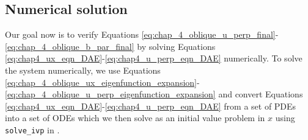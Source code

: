 \subsection{Numerical solution}
\label{sec:oblique_field_resonant_absorption_numerical_soln}

Our goal now is to verify Equations \eqref{eq:chap_4_oblique_u_perp_final}-\eqref{eq:chap_4_oblique_b_par_final} by solving Equations \eqref{eq:chap4_ux_eqn_DAE}-\eqref{eq:chap4_u_perp_eqn_DAE} numerically. To solve the system numerically, we use Equations \eqref{eq:chap_4_oblique_ux_eigenfunction_expansion}-\eqref{eq:chap_4_oblique_u_perp_eigenfunction_expansion} and convert Equations \eqref{eq:chap4_ux_eqn_DAE}-\eqref{eq:chap4_u_perp_eqn_DAE} from a set of PDEs into a set of ODEs which we then solve as an initial value problem in $x$ using \texttt{solve\_ivp} in \citet{SciPy2020}.


